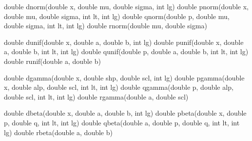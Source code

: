 \documentclass[]{book}
\newenvironment{Shaded}{\begin{snugshade}}{\end{snugshade}}
\newcommand{\DataTypeTok}[1]{\textcolor[rgb]{0.13,0.29,0.53}{#1}}
\newcommand{\NormalTok}[1]{#1}
\begin{document}
\begin{Shaded}
\begin{Highlighting}[]
\DataTypeTok{double}\NormalTok{ dnorm(}\DataTypeTok{double}\NormalTok{ x, }\DataTypeTok{double}\NormalTok{ mu, }\DataTypeTok{double}\NormalTok{ sigma, }\DataTypeTok{int}\NormalTok{ lg)              }
\DataTypeTok{double}\NormalTok{ pnorm(}\DataTypeTok{double}\NormalTok{ x, }\DataTypeTok{double}\NormalTok{ mu, }\DataTypeTok{double}\NormalTok{ sigma, }\DataTypeTok{int}\NormalTok{ lt, }\DataTypeTok{int}\NormalTok{ lg)      }
\DataTypeTok{double}\NormalTok{ qnorm(}\DataTypeTok{double}\NormalTok{ p, }\DataTypeTok{double}\NormalTok{ mu, }\DataTypeTok{double}\NormalTok{ sigma, }\DataTypeTok{int}\NormalTok{ lt, }\DataTypeTok{int}\NormalTok{ lg)      }
\DataTypeTok{double}\NormalTok{ rnorm(}\DataTypeTok{double}\NormalTok{ mu, }\DataTypeTok{double}\NormalTok{ sigma) }

\DataTypeTok{double}\NormalTok{ dunif(}\DataTypeTok{double}\NormalTok{ x, }\DataTypeTok{double}\NormalTok{ a, }\DataTypeTok{double}\NormalTok{ b, }\DataTypeTok{int}\NormalTok{ lg)      }
\DataTypeTok{double}\NormalTok{ punif(}\DataTypeTok{double}\NormalTok{ x, }\DataTypeTok{double}\NormalTok{ a, }\DataTypeTok{double}\NormalTok{ b, }\DataTypeTok{int}\NormalTok{ lt, }\DataTypeTok{int}\NormalTok{ lg)   }
\DataTypeTok{double}\NormalTok{ qunif(}\DataTypeTok{double}\NormalTok{ p, }\DataTypeTok{double}\NormalTok{ a, }\DataTypeTok{double}\NormalTok{ b, }\DataTypeTok{int}\NormalTok{ lt, }\DataTypeTok{int}\NormalTok{ lg)   }
\DataTypeTok{double}\NormalTok{ runif(}\DataTypeTok{double}\NormalTok{ a, }\DataTypeTok{double}\NormalTok{ b)                             }

\DataTypeTok{double}\NormalTok{ dgamma(}\DataTypeTok{double}\NormalTok{ x, }\DataTypeTok{double}\NormalTok{ shp, }\DataTypeTok{double}\NormalTok{ scl, }\DataTypeTok{int}\NormalTok{ lg)    }
\DataTypeTok{double}\NormalTok{ pgamma(}\DataTypeTok{double}\NormalTok{ x, }\DataTypeTok{double}\NormalTok{ alp, }\DataTypeTok{double}\NormalTok{ scl, }\DataTypeTok{int}\NormalTok{ lt, }\DataTypeTok{int}\NormalTok{ lg) }
\DataTypeTok{double}\NormalTok{ qgamma(}\DataTypeTok{double}\NormalTok{ p, }\DataTypeTok{double}\NormalTok{ alp, }\DataTypeTok{double}\NormalTok{ scl, }\DataTypeTok{int}\NormalTok{ lt, }\DataTypeTok{int}\NormalTok{ lg) }
\DataTypeTok{double}\NormalTok{ rgamma(}\DataTypeTok{double}\NormalTok{ a, }\DataTypeTok{double}\NormalTok{ scl)}

\DataTypeTok{double}\NormalTok{ dbeta(}\DataTypeTok{double}\NormalTok{ x, }\DataTypeTok{double}\NormalTok{ a, }\DataTypeTok{double}\NormalTok{ b, }\DataTypeTok{int}\NormalTok{ lg)         }
\DataTypeTok{double}\NormalTok{ pbeta(}\DataTypeTok{double}\NormalTok{ x, }\DataTypeTok{double}\NormalTok{ p, }\DataTypeTok{double}\NormalTok{ q, }\DataTypeTok{int}\NormalTok{ lt, }\DataTypeTok{int}\NormalTok{ lg) }
\DataTypeTok{double}\NormalTok{ qbeta(}\DataTypeTok{double}\NormalTok{ a, }\DataTypeTok{double}\NormalTok{ p, }\DataTypeTok{double}\NormalTok{ q, }\DataTypeTok{int}\NormalTok{ lt, }\DataTypeTok{int}\NormalTok{ lg) }
\DataTypeTok{double}\NormalTok{ rbeta(}\DataTypeTok{double}\NormalTok{ a, }\DataTypeTok{double}\NormalTok{ b)                           }


\end{Highlighting}
\end{Shaded}
\end{document}
